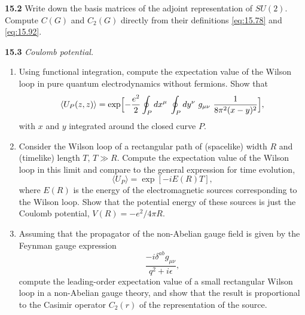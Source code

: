\textbf{15.2} Write down the basis matrices of the adjoint representation of
$SU(2)$.  Compute $C(G)$ and $C_2(G)$ directly from their definitions
\eqref{eq:15.78} and \eqref{eq:15.92}.

\textbf{15.3} \emph{Coulomb potential.}
\begin{enumerate}[label=(\alph*)]
  \item Using functional integration, compute the expectation value of the
    Wilson loop in pure quantum electrodynamics without fermions.  Show that
    \begin{equation}
      \langle U_P(z,z) \rangle = \exp\Bigl[ -\frac{e^2}{2}\oint_P dx^\mu\;
        \oint_P dy^\nu\ g_{\mu\nu}\ \frac{1}{8\pi^2(x-y)^2} \Bigr] ,
    \end{equation}
    with $x$ and $y$ integrated around the closed curve $P$.
  \item Consider the Wilson loop of a rectangular path of (spacelike) width
    $R$ and (timelike) length $T$, $T\gg R$.  Compute the expectation value of
    the Wilson loop in this limit and compare to the general expression for
    time evolution,
    \begin{equation}
      \langle U_P \rangle = \exp[-iE(R)T] ,
    \end{equation}
    where $E(R)$ is the energy of the electromagnetic sources corresponding
    to the Wilson loop.  Show that the potential energy of these sources is
    just the Coulomb potential, $V(R) = -e^2/4\pi R$.
  \item Assuming that the propagator of the non-Abelian gauge field is given
    by the Feynman gauge expression
    \begin{equation}
      \frac{-i\delta^{ab}g_{\mu\nu}}{q^2+i\epsilon} ,
    \end{equation}
    compute the leading-order expectation value of a small rectangular
    Wilson loop in a non-Abelian gauge theory, and show that the result is
    proportional to the Casimir operator $C_2(r)$ of the representation of
    the source.
\end{enumerate}
